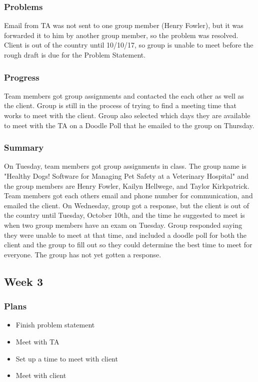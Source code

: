 \documentclass[onecolumn, draftclsnofoot,10pt, compsoc]{IEEEtran}
\begin{document}
\subsubsection{Problems}
Email from TA was not sent to one group member (Henry Fowler), but it was forwarded it to him by another group member, so the problem was resolved.
Client is out of the country until 10/10/17, so group is unable to meet before the rough draft is due for the Problem Statement.

\subsubsection{Progress}
Team members got group assignments and contacted the each other as well as the client. Group is still in the process of trying to find a meeting time that works to meet with the client. Group also selected which days they are available to meet with the TA on a Doodle Poll that he emailed to the group on Thursday. 
\subsubsection{Summary}
On Tuesday, team members got group assignments in class. The group name  is "Healthy Dogs! Software for Managing Pet Safety at a Veterinary Hospital" and the group members are Henry Fowler, Kailyn Hellwege,  and Taylor Kirkpatrick. Team members got each others email and phone number for communication, and emailed the client. On Wednesday, group got a response, but the client is out of the country until Tuesday, October 10th, and the time he suggested to meet is when two group members have an exam on Tuesday. Group responded saying they were unable to meet at that time, and included a doodle poll for both the client and the group to fill out so they could determine the best time to meet for everyone. The group has not yet gotten a response. 

\subsection{Week 3}

\subsubsection{Plans}
\begin{itemize}
\item Finish problem statement
\item Meet with TA
\item Set up a time to meet with client
\item Meet with client
\end{itemize}
\end{document}
